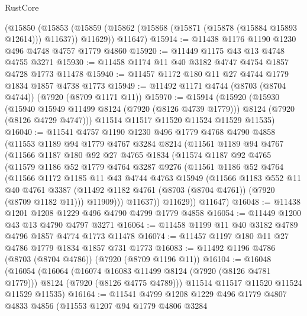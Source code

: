 \begin{lexlean}{RustCore}
\begin{coremodule}
    (@15850
      (@15853 (@15859 (@15862 (@15868 (@15871 (@15878 (@15884 @15893 @12614))) @11637)) @11629))
      @11647)
@15914 := @11438 @1176 @1190 @1230 @496 @4748 @4757 @1779 @4860
@15920 := @11449 @1175 @43 @13 @4748 @4755 @3271
@15930 := @11458 @1174 @11 @40 @3182 @4747 @4754 @1857 @4728 @1773 @11478
@15940 := @11457 @1172 @180 @11 @27 @4744 @1779 @1834 @1857 @4738 @1773
@15949 := @11492 @1171 @4744 (@8703 (@8704 @4744)) (@7920 (@8709 @1171 @11))
@15970 := @15914
    (@15920
      (@15930
        (@15940 @15949 @11499 @8124 (@7920 (@8126 @4739 @1779)))
        @8124
        (@7920 (@8126 @4729 @4747)))
      @11514
      @11517
      @11520
      @11524
      @11529
      @11535)
@16040 := @11541
    @4757
    @1190
    @1230
    @496
    @1779
    @4768
    @4790
    @4858
    (@11553
      @1189
      @94
      @1779
      @4767
      @3284
      @8214
      (@11561
        @1189
        @94
        @4767
        (@11566
          @1187
          @180
          @92
          @27
          @4765
          @1834
          (@11574
            @1187
            @92
            @4765
            (@11579
              @1186
              @52
              @1779
              @4764
              @3287
              @9276
              (@11561
                @1186
                @52
                @4764
                (@11566
                  @1172
                  @1185
                  @11
                  @43
                  @4744
                  @4763
                  @15949
                  (@11566
                    @1183
                    @552
                    @11
                    @40
                    @4761
                    @3387
                    (@11492 @1182 @4761 (@8703 (@8704 @4761)) (@7920 (@8709 @1182 @11)))
                    @11909)))
              @11637))
          @11629))
      @11647)
@16048 := @11438 @1201 @1208 @1229 @496 @4790 @4799 @1779 @4858
@16054 := @11449 @1200 @43 @13 @4790 @4797 @3271
@16064 := @11458 @1199 @11 @40 @3182 @4789 @4796 @1857 @4774 @1773 @11478
@16074 := @11457 @1197 @180 @11 @27 @4786 @1779 @1834 @1857 @731 @1773
@16083 := @11492 @1196 @4786 (@8703 (@8704 @4786)) (@7920 (@8709 @1196 @11))
@16104 := @16048
    (@16054
      (@16064
        (@16074 @16083 @11499 @8124 (@7920 (@8126 @4781 @1779)))
        @8124
        (@7920 (@8126 @4775 @4789)))
      @11514
      @11517
      @11520
      @11524
      @11529
      @11535)
@16164 := @11541
    @4799
    @1208
    @1229
    @496
    @1779
    @4807
    @4833
    @4856
    (@11553
      @1207
      @94
      @1779
      @4806
      @3284

\end{coremodule}
\end{lexlean}
